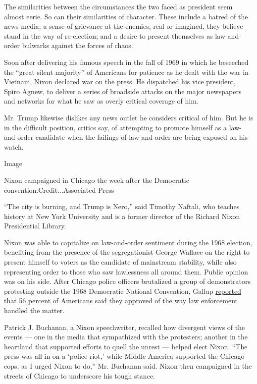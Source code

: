 The similarities between the circumstances the two faced as president
seem almost eerie. So can their similarities of character. These include
a hatred of the news media; a sense of grievance at the enemies, real or
imagined, they believe stand in the way of re-election; and a desire to
present themselves as law-and-order bulwarks against the forces of
chaos.

Soon after delivering his famous speech in the fall of 1969 in which he
beseeched the ``great silent majority'' of Americans for patience as he
dealt with the war in Vietnam, Nixon declared war on the press. He
dispatched his vice president, Spiro Agnew, to deliver a series of
broadside attacks on the major newspapers and networks for what he saw
as overly critical coverage of him.

Mr. Trump likewise dislikes any news outlet he considers critical of
him. But he is in the difficult position, critics say, of attempting to
promote himself as a law-and-order candidate when the failings of law
and order are being exposed on his watch.

Image

Nixon campaigned in Chicago the week after the Democratic
convention.Credit...Associated Press

``The city is burning, and Trump is Nero,'' said Timothy Naftali, who
teaches history at New York University and is a former director of the
Richard Nixon Presidential Library.

Nixon was able to capitalize on law-and-order sentiment during the 1968
election, benefiting from the presence of the segregationist George
Wallace on the right to present himself to voters as the candidate of
mainstream stability, while also representing order to those who saw
lawlessness all around them. Public opinion was on his side. After
Chicago police officers brutalized a group of demonstrators protesting
outside the 1968 Democratic National Convention, Gallup
\href{https://news.gallup.com/poll/8053/gallup-brain-war-peace-protests.aspx}{reported}
that 56 percent of Americans said they approved of the way law
enforcement handled the matter.

Patrick J. Buchanan, a Nixon speechwriter, recalled how divergent views
of the events --- one in the media that sympathized with the protesters;
another in the heartland that supported efforts to quell the unrest ---
helped elect Nixon. ``The press was all in on a `police riot,' while
Middle America supported the Chicago cops, as I urged Nixon to do,'' Mr.
Buchanan said. Nixon then campaigned in the streets of Chicago to
underscore his tough stance.

